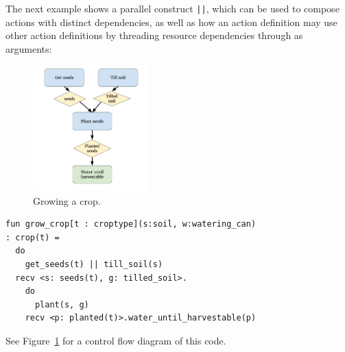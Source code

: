 The next example shows a parallel construct \verb/||/, which can be used to
compose actions with distinct dependencies, as well as
how an action definition may use other action definitions by threading
resource dependencies through as arguments:

\begin{figure}
  \includegraphics[width=0.4\textwidth]{sdv-grow-crop.png}
  \caption{Growing a crop.}
  \label{fig:grow}
\end{figure}

\begin{verbatim}
fun grow_crop[t : croptype](s:soil, w:watering_can)
: crop(t) =
  do
    get_seeds(t) || till_soil(s)
  recv <s: seeds(t), g: tilled_soil>.
    do
      plant(s, g)
    recv <p: planted(t)>.water_until_harvestable(p)
\end{verbatim}
See Figure~\ref{fig:grow} for a control flow diagram of this code.

 
% 
% 

